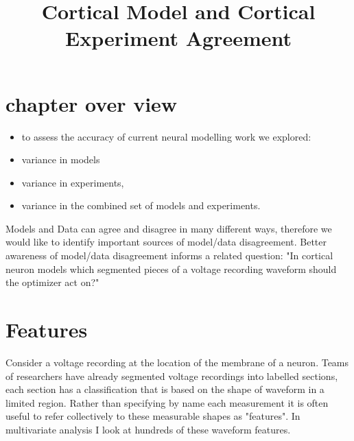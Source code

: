 
\section{chapter over view}
\begin{itemize}

\item to assess the accuracy of current neural modelling work we explored:
\item variance in models
\item variance in experiments,  
\item variance in the combined set of models and experiments.


\end{itemize}


\title{Cortical Model and Cortical Experiment Agreement}
Models and Data can agree and disagree in many different ways, therefore we would like to identify important sources of model/data disagreement. Better awareness of model/data disagreement informs a related question: "In  cortical neuron models which segmented pieces of a voltage recording waveform should the optimizer act on?"

\section{Features} Consider a voltage recording at the location of the membrane of a neuron. Teams of researchers have already segmented voltage recordings into labelled sections, each section has a classification that is based on the shape of waveform in a limited region. Rather than specifying by name each measurement it is often useful to refer collectively to these measurable shapes as "features". In multivariate analysis I look at hundreds of these waveform features. 

